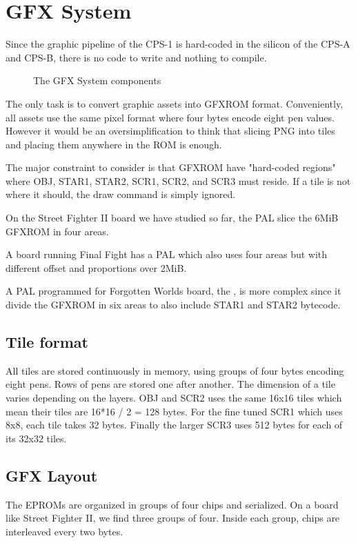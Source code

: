 \chapter{GFX System}
Since the graphic pipeline of the CPS-1 is hard-coded in the silicon of the CPS-A and CPS-B, there is no code to write and nothing to compile. 

\begin{figure}[H]
\caption*{The GFX System components}
\end{figure}

The only task is to convert graphic assets into GFXROM format. Conveniently, all assets use the same pixel format where four bytes encode eight pen values. However it would be an oversimplification to think that slicing PNG into tiles and placing them anywhere in the ROM is enough.

The major constraint to consider is that GFXROM have "hard-coded regions" where OBJ, STAR1, STAR2, SCR1, SCR2, and SCR3 must reside. If a tile is not where it should, the draw command is simply ignored.

On the Street Fighter II board we have studied so far, the  PAL slice the 6MiB GFXROM in four areas. 

A board running Final Fight has a  PAL which also uses four areas but with different offset and proportions over 2MiB. 

A PAL programmed for Forgotten Worlds board, the , is more complex since it divide the GFXROM in six areas to also include STAR1 and STAR2 bytecode.


\section{Tile format}
All tiles are stored continuously in memory, using groups of four bytes encoding eight pens. Rows of pens are stored one after another. The dimension of a tile varies depending on the layers. OBJ and SCR2 uses the same 16x16 tiles which mean their tiles are 16*16 / 2 = 128 bytes. For the fine tuned SCR1 which uses 8x8, each tile takes 32 bytes. Finally the larger SCR3 uses 512 bytes for each of its 32x32 tiles.

\section{GFX Layout}
The EPROMs are organized in groups of four chips and serialized. On a board like Street Fighter II, we find three groups of four. Inside each group, chips are interleaved every two bytes.

